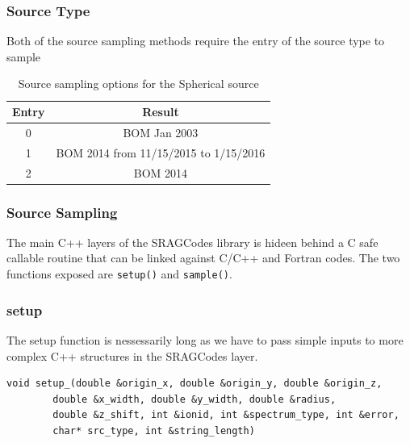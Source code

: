 \subsubsection*{Source Type}
Both of the source sampling methods require the entry of the source type to sample
\begin{table}[ht!]
 \begin{tabular}{c|c}
 Entry & Result \\
 \hline
 0  & BOM Jan 2003 \\
 1  & BOM 2014 from 11/15/2015 to 1/15/2016 \\
 2  & BOM 2014 \\
 \end{tabular}
\label{tab:source_type}
\caption{Source sampling options for the Spherical source}
\end{table}

\subsubsection*{Source Sampling}
The main C++ layers of the SRAGCodes library is hideen behind a C safe callable routine that can be linked
against C/C++ and Fortran codes. The two functions exposed are \texttt{setup()} and \texttt{sample()}. 
\subsubsection*{setup}
The setup function is nessessarily long as we have to pass simple inputs to more complex C++ structures
in the SRAGCodes layer.
\lstset{language=C++}
\begin{lstlisting}
void setup_(double &origin_x, double &origin_y, double &origin_z,
        double &x_width, double &y_width, double &radius,
        double &z_shift, int &ionid, int &spectrum_type, int &error,
        char* src_type, int &string_length)
\end{lstlisting}


